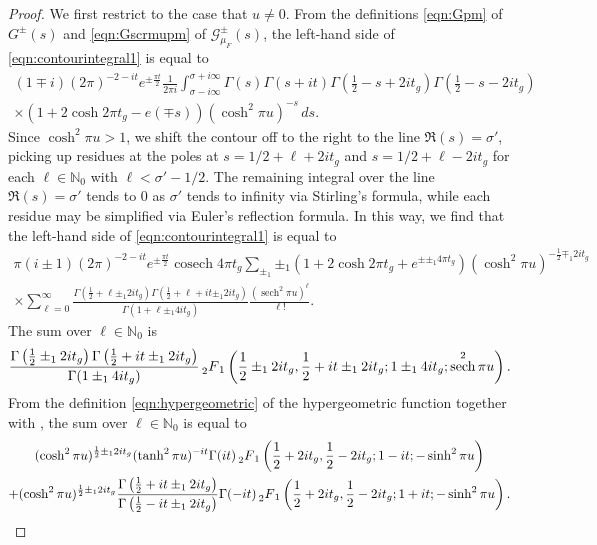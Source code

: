 \documentclass[11pt,a4paper]{amsart}
\newcommand{\Gscr}{\mathscr{G}}
\newcommand{\N}{\mathbb{N}}
\DeclareMathOperator{\cosech}{cosech}
\DeclareMathOperator{\sech}{sech}
\numberwithin{equation}{section}
\theoremstyle{remark}
\theoremstyle{definition}
\begin{document}
\begin{proof}
We first restrict to the case that $u \neq 0$. From the definitions \eqref{eqn:Gpm} of $G^{\pm}(s)$ and \eqref{eqn:Gscrmupm} of $\Gscr_{\mu_F}^{\pm}(s)$, the left-hand side of \eqref{eqn:contourintegral1} is equal to
\begin{multline*}
(1 \mp i) (2\pi)^{-2 - it} e^{\pm \frac{\pi t}{2}} \frac{1}{2\pi i} \int_{\sigma - i\infty}^{\sigma + i\infty} \Gamma(s) \Gamma(s + it) \Gamma\left(\frac{1}{2} - s + 2it_g\right) \Gamma\left(\frac{1}{2} - s - 2it_g\right)	\\
\times (1 + 2 \cosh 2\pi t_g - e(\mp s)) (\cosh^2 \pi u)^{-s} \, ds.
\end{multline*}
Since $\cosh^2 \pi u > 1$, we shift the contour off to the right to the line $\Re(s) = \sigma'$, picking up residues at the poles at $s = 1/2 + \ell + 2it_g$ and $s = 1/2 + \ell - 2it_g$ for each $\ell \in \N_0$ with $\ell < \sigma' - 1/2$. The remaining integral over the line $\Re(s) = \sigma'$ tends to $0$ as $\sigma'$ tends to infinity via Stirling's formula, while each residue may be simplified via Euler's reflection formula. In this way, we find that the left-hand side of \eqref{eqn:contourintegral1} is equal to
\begin{multline*}
\pi (i \pm 1) (2\pi)^{-2 - it} e^{\pm \frac{\pi t}{2}} \cosech 4\pi t_g \sum_{\pm_1} \pm_1 (1 + 2 \cosh 2\pi t_g + e^{\pm \pm_1 4\pi t_g}) (\cosh^2 \pi u)^{-\frac{1}{2} \mp_1 2it_g}	\\
\times \sum_{\ell = 0}^{\infty} \frac{\Gamma\left(\frac{1}{2} + \ell \pm_1 2it_g\right) \Gamma\left(\frac{1}{2} + \ell + it \pm_1 2it_g\right)}{\Gamma\left(1 + \ell \pm_1 4it_g\right)} \frac{(\sech^2 \pi u)^{\ell}}{\ell!}.
\end{multline*}
The sum over $\ell \in \N_0$ is
\[\frac{\Gamma\left(\frac{1}{2} \pm_1 2it_g\right) \Gamma\left(\frac{1}{2} + it \pm_1 2it_g\right)}{\Gamma(1 \pm_1 4it_g)} \prescript{}{2}{F}_1\left(\frac{1}{2} \pm_1 2it_g, \frac{1}{2} + it \pm_1 2it_g; 1 \pm_1 4it_g; \sech^2 \pi u\right).\]
From the definition \eqref{eqn:hypergeometric} of the hypergeometric function together with \cite[9.131.1, 9.131.2]{GR15}, the sum over $\ell \in \N_0$ is equal to
\begin{multline*}
(\cosh^2 \pi u)^{\frac{1}{2} \pm_1 2it_g} (\tanh^2 \pi u)^{-it} \Gamma(it) \prescript{}{2}{F}_1\left(\frac{1}{2} + 2it_g,\frac{1}{2} - 2it_g;1 - it; -\sinh^2 \pi u\right)	\\
+ (\cosh^2 \pi u)^{\frac{1}{2} \pm_1 2it_g} \frac{\Gamma\left(\frac{1}{2} + it \pm_1 2it_g\right)}{\Gamma\left(\frac{1}{2} - it \pm_1 2it_g\right)} \Gamma(-it) \prescript{}{2}{F}_1\left(\frac{1}{2} + 2it_g,\frac{1}{2} - 2it_g;1 + it; -\sinh^2 \pi u\right).

\end{multline*}
\end{proof}
\end{document}
